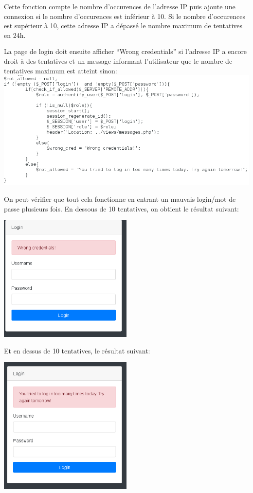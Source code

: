 \documentclass{article}
\begin{document}
Cette fonction compte le nombre d'occurences de l'adresse IP puis ajoute
une connexion si le nombre d'occurences est inférieur à 10. Si le nombre
d'occurences est supérieur à 10, cette adresse IP a dépassé le nombre
maximum de tentatives en 24h.

La page de login doit ensuite afficher ``Wrong credentials'' si
l'adresse IP a encore droit à des tentatives et un message informant
l'utilisateur que le nombre de tentatives maximum est atteint sinon:\\

\includegraphics[width=\textwidth]{images/tentative_login.PNG}

On peut vérifier que tout cela fonctionne en entrant un mauvais
login/mot de passe plusieurs fois. En dessous de 10 tentatives, on
obtient le résultat suivant:

\begin{center}\includegraphics[width=0.5\textwidth]{images/tentative_moins_10.PNG}\end{center}

Et en dessus de 10 tentatives, le résultat suivant:

\begin{center}\includegraphics[width=0.5\textwidth]{images/tentative_plus_10.PNG}\end{center}
\end{document}
